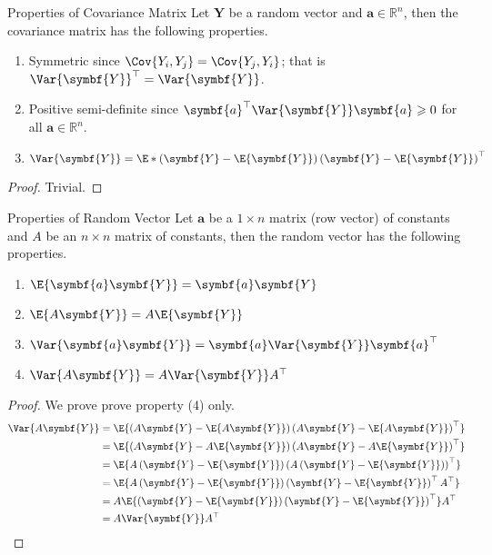 \begin{Proposition}{Properties of Covariance Matrix}{}
    Let $ \symbf{Y} $ be a random vector and $ \symbf{a}\in\mathbb{R}^n $,
    then the covariance matrix has the following properties.
    \begin{enumerate}[label=(\arabic*)]
        \item Symmetric since $ \Cov{Y_i,Y_j}=\Cov{Y_j,Y_i} $; that is $ \Var{\symbf{Y}}^\top=\Var{\symbf{Y}} $.
        \item Positive semi-definite since
              $ \symbf{a}^\top\Var{\symbf{Y}}\symbf{a}\geqslant 0 $
              for all $ \symbf{a}\in\mathbb{R}^n $.
        \item $ \Var{\symbf{Y}}=
                  \E*{\left( \symbf{Y}-\E{\symbf{Y}} \right)\left( \symbf{Y}-\E{\symbf{Y}} \right)^\top} $
    \end{enumerate}
\end{Proposition}
\begin{proof}
    Trivial.
\end{proof}
\begin{Proposition}{Properties of Random Vector}{}
    Let $ \symbf{a} $ be a $ 1\times n $ matrix (row vector)
    of constants and $ A $ be an $ n\times n $ matrix of constants, then
    the random vector has the following properties.
    \begin{enumerate}[label=(\arabic*)]
        \item $ \E{\symbf{a}\symbf{Y}}=\symbf{a}\symbf{Y} $
        \item $ \E{A\symbf{Y}}=A\E{\symbf{Y}} $
        \item $ \Var{\symbf{a}\symbf{Y}}=\symbf{a}\Var{\symbf{Y}}\symbf{a}^\top $
        \item $ \Var{A\symbf{Y}}=A\Var{\symbf{Y}}A^\top $
    \end{enumerate}
\end{Proposition}
\begin{proof}
    We prove prove property (4) only.
    \begin{align*}
        \Var{A\symbf{Y}}
         & =\E{\left(A\symbf{Y}-\E{A\symbf{Y}}\right)
        \left(A\symbf{Y}-\E{A\symbf{Y}}\right)^\top}                                                     \\
         & =\E{\left( A\symbf{Y}-A\E{\symbf{Y}} \right)
        \left( A\symbf{Y}-A\E{\symbf{Y}} \right)^\top}                                                   \\
         & =\E{A\left( \symbf{Y}-\E{\symbf{Y}} \right)
        \left( A\left( \symbf{Y}-\E{\symbf{Y}} \right) \right)^\top}                                     \\
         & =\E{A\left( \symbf{Y}-\E{\symbf{Y}} \right)
        \left( \symbf{Y}-\E{\symbf{Y}} \right)^\top A^\top}                                              \\
         & =A\E{\left( \symbf{Y}-\E{\symbf{Y}} \right)\left( \symbf{Y}-\E{\symbf{Y}} \right)^\top}A^\top \\
         & =A\Var{\symbf{Y}}A^\top
    \end{align*}
\end{proof}

